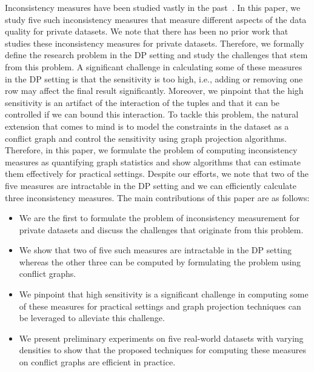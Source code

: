 Inconsistency measures have been studied vastly in the past~\cite{hunter2008measuring, thimm2017compliance, LivshitsBKS20, LivshitsKTIKR21}. In this paper, we study five such inconsistency measures that measure different aspects of the data quality for private datasets. We note that there has been no prior work that studies these inconsistency measures for private datasets. Therefore, we formally define the research problem in the DP setting and study the challenges that stem from this problem. 
A significant challenge in calculating some of these measures in the DP setting is that the sensitivity is too high, i.e., adding or removing one row may affect the final result significantly. Moreover, we pinpoint that the high sensitivity is an artifact of the interaction of the tuples and that it can be controlled if we can bound this interaction. To tackle this problem, the natural extension that comes to mind is to model the constraints in the dataset as a conflict graph and control the sensitivity using graph projection algorithms. Therefore, in this paper, we formulate the problem of computing inconsistency measures as quantifying graph statistics and show algorithms that can estimate them effectively for practical settings. Despite our efforts, we note that two of the five measures are intractable in the DP setting and we can efficiently calculate three inconsistency measures. The main contributions of this paper are as follows: 
 
\begin{itemize}
    \item We are the first to formulate the problem of inconsistency measurement for private datasets and discuss the challenges that originate from this problem. 
    \item We show that two of five such measures are intractable in the DP setting whereas the other three can be computed by formulating the problem using conflict graphs.
    \item We pinpoint that high sensitivity is a significant challenge in computing some of these measures for practical settings and graph projection techniques can be leveraged to alleviate this challenge.
    \item We present preliminary experiments on five real-world datasets with varying densities to show that the proposed techniques for computing these measures on conflict graphs are efficient in practice.
\end{itemize}

